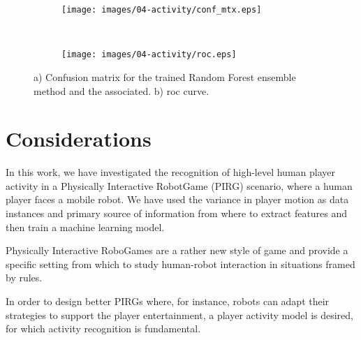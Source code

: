 \begin{figure}[h]
    \centering
    \begin{subfigure}[b]{7cm}
       \centering
       \texttt{[image: images/04-activity/conf\_mtx.eps]}
       \caption{}
	\end{subfigure}
	~
    \begin{subfigure}[b]{7cm}
     	\centering
        \texttt{[image: images/04-activity/roc.eps]}
        \caption{}
	\end{subfigure}
	\caption{a) Confusion matrix for the trained Random Forest ensemble method and the associated. b) \gls{roc} curve.}\label{fig:mtx-roc}
\end{figure}

\section{Considerations}
In this work, we have investigated the recognition of high-level human player activity in a Physically Interactive RobotGame (PIRG) scenario, where a human player faces a mobile robot. We have used the variance in player motion as data instances and primary source of information from where to extract features and then train a machine learning model. 

Physically Interactive RoboGames are a rather new style of game and provide a specific setting from which to study human-robot interaction in situations framed by rules.

In order to design better PIRGs where, for instance, robots can adapt their strategies to support the player entertainment, a player activity model is desired, for which activity recognition is fundamental. 


